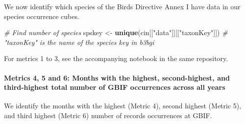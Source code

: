 \documentclass[
]{article}
\newenvironment{Shaded}{\begin{snugshade}}{\end{snugshade}}
\newcommand{\CommentTok}[1]{\textcolor[rgb]{0.56,0.35,0.01}{\textit{#1}}}
\newcommand{\FunctionTok}[1]{\textcolor[rgb]{0.13,0.29,0.53}{\textbf{#1}}}
\newcommand{\NormalTok}[1]{#1}
\newcommand{\OtherTok}[1]{\textcolor[rgb]{0.56,0.35,0.01}{#1}}
\newcommand{\StringTok}[1]{\textcolor[rgb]{0.31,0.60,0.02}{#1}}
\begin{document}
We now identify which species of the Birds Directive Annex I have data
in our species occurrence cubes.

\begin{Shaded}
\begin{Highlighting}[]
\CommentTok{\# Find number of species}
\NormalTok{spskey }\OtherTok{\textless{}{-}} \FunctionTok{unique}\NormalTok{(cin[[}\StringTok{"data"}\NormalTok{]][[}\StringTok{"taxonKey"}\NormalTok{]]) }\CommentTok{\# "taxonKey" is the name of the species key in b3bgi}
\end{Highlighting}
\end{Shaded}

For metrics 1 to 3, see the accompanying notebook in the same
repository.

\paragraph{\texorpdfstring{\textbf{Metrics 4, 5 and 6:} Months with the
highest, second-highest, and third-highest total number of GBIF
occurrences across all
years}{Metrics 4, 5 and 6: Months with the highest, second-highest, and third-highest total number of GBIF occurrences across all years}}\label{metrics-4-5-and-6-months-with-the-highest-second-highest-and-third-highest-total-number-of-gbif-occurrences-across-all-years}

We identify the months with the highest (Metric 4), second highest
(Metric 5), and third highest (Metric 6) number of records occurrences
at GBIF.
\end{document}
